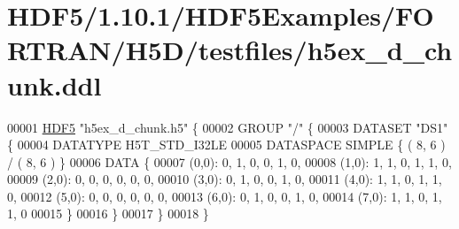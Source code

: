 \hypertarget{_h_d_f5_21_810_81_2_h_d_f5_examples_2_f_o_r_t_r_a_n_2_h5_d_2testfiles_2h5ex__d__chunk_8ddl_source}{}\section{H\+D\+F5/1.10.1/\+H\+D\+F5\+Examples/\+F\+O\+R\+T\+R\+A\+N/\+H5\+D/testfiles/h5ex\+\_\+d\+\_\+chunk.ddl}
\label{_h_d_f5_21_810_81_2_h_d_f5_examples_2_f_o_r_t_r_a_n_2_h5_d_2testfiles_2h5ex__d__chunk_8ddl_source}

\begin{DoxyCode}
00001 \hyperlink{namespace_h_d_f5}{HDF5} \textcolor{stringliteral}{"h5ex\_d\_chunk.h5"} \{
00002 GROUP \textcolor{stringliteral}{"/"} \{
00003    DATASET \textcolor{stringliteral}{"DS1"} \{
00004       DATATYPE  H5T\_STD\_I32LE
00005       DATASPACE  SIMPLE \{ ( 8, 6 ) / ( 8, 6 ) \}
00006       DATA \{
00007       (0,0): 0, 1, 0, 0, 1, 0,
00008       (1,0): 1, 1, 0, 1, 1, 0,
00009       (2,0): 0, 0, 0, 0, 0, 0,
00010       (3,0): 0, 1, 0, 0, 1, 0,
00011       (4,0): 1, 1, 0, 1, 1, 0,
00012       (5,0): 0, 0, 0, 0, 0, 0,
00013       (6,0): 0, 1, 0, 0, 1, 0,
00014       (7,0): 1, 1, 0, 1, 1, 0
00015       \}
00016    \}
00017 \}
00018 \}
\end{DoxyCode}
